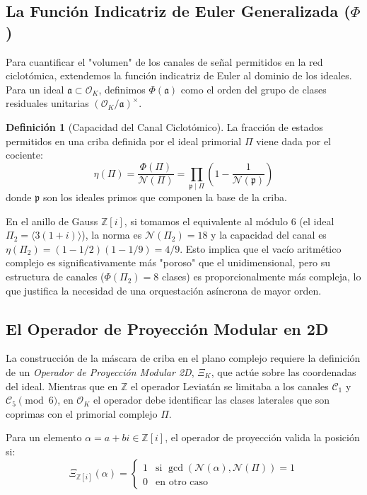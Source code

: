 \documentclass[12pt, a4paper]{article}
\theoremstyle{plain}
\theoremstyle{definition}
\newtheorem{definicion}[teorema]{Definición}
\theoremstyle{remark}
\newcommand{\Z}{\mathbb{Z}}
\newcommand{\OK}{\mathcal{O}_K}
\newcommand{\Norm}{\mathcal{N}}
\begin{document}
\subsection{La Función Indicatriz de Euler Generalizada ($\Phi$)}

Para cuantificar el "volumen" de los canales de señal permitidos en la red ciclotómica, extendemos la función indicatriz de Euler al dominio de los ideales. Para un ideal $\mathfrak{a} \subset \OK$, definimos $\Phi(\mathfrak{a})$ como el orden del grupo de clases residuales unitarias $(\OK/\mathfrak{a})^\times$.

\begin{definicion}[Capacidad del Canal Ciclotómico]
La fracción de estados permitidos en una criba definida por el ideal primorial $\Pi$ viene dada por el cociente:
\begin{equation}
    \eta(\Pi) = \frac{\Phi(\Pi)}{\Norm(\Pi)} = \prod_{\mathfrak{p} \mid \Pi} \left( 1 - \frac{1}{\Norm(\mathfrak{p})} \right)
\end{equation}
donde $\mathfrak{p}$ son los ideales primos que componen la base de la criba.
\end{definicion}

En el anillo de Gauss $\Z[i]$, si tomamos el equivalente al módulo 6 (el ideal $\Pi_2 = \langle 3(1+i) \rangle$), la norma es $\Norm(\Pi_2) = 18$ y la capacidad del canal es $\eta(\Pi_2) = (1 - 1/2)(1 - 1/9) = 4/9$. Esto implica que el vacío aritmético complejo es significativamente más "poroso" que el unidimensional, pero su estructura de canales ($\Phi(\Pi_2) = 8$ clases) es proporcionalmente más compleja, lo que justifica la necesidad de una orquestación asíncrona de mayor orden.

\subsection{El Operador de Proyección Modular en 2D}

La construcción de la máscara de criba en el plano complejo requiere la definición de un \textit{Operador de Proyección Modular 2D}, $\Xi_K$, que actúe sobre las coordenadas del ideal. Mientras que en $\Z$ el operador Leviatán se limitaba a los canales $\mathcal{C}_1$ y $\mathcal{C}_5 \pmod 6$, en $\OK$ el operador debe identificar las clases laterales que son coprimas con el primorial complejo $\Pi$.

\begin{modelo}
Para un elemento $\alpha = a + bi \in \Z[i]$, el operador de proyección valida la posición si:
\begin{equation}
    \Xi_{\Z[i]}(\alpha) = 
    \begin{cases} 
    1 & \text{si } \gcd(\Norm(\alpha), \Norm(\Pi)) = 1 \\
    0 & \text{en otro caso}
    \end{cases}
\end{equation}
\end{modelo}
\end{document}
